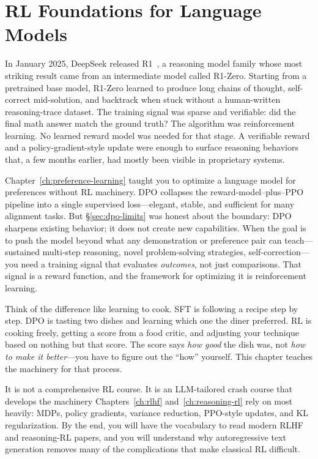 \chapter{RL Foundations for Language Models}
\label{ch:rl-foundations}
\raggedbottom

In January 2025, DeepSeek released R1~\cite{deepseekai2025r1}, a reasoning model family whose most striking result came from an intermediate model called R1-Zero. Starting from a pretrained base model, R1-Zero learned to produce long chains of thought, self-correct mid-solution, and backtrack when stuck without a human-written reasoning-trace dataset. The training signal was sparse and verifiable: did the final math answer match the ground truth? The algorithm was reinforcement learning. No learned reward model was needed for that stage. A verifiable reward and a policy-gradient-style update were enough to surface reasoning behaviors that, a few months earlier, had mostly been visible in proprietary systems.

Chapter~\ref{ch:preference-learning} taught you to optimize a language model for preferences without RL machinery. DPO collapses the reward-model--plus--PPO pipeline into a single supervised loss---elegant, stable, and sufficient for many alignment tasks. But \S\ref{sec:dpo-limits} was honest about the boundary: DPO sharpens existing behavior; it does not create new capabilities. When the goal is to push the model beyond what any demonstration or preference pair can teach---sustained multi-step reasoning, novel problem-solving strategies, self-correction---you need a training signal that evaluates \emph{outcomes}, not just comparisons. That signal is a reward function, and the framework for optimizing it is reinforcement learning.

Think of the difference like learning to cook. SFT is following a recipe step by step. DPO is tasting two dishes and learning which one the diner preferred. RL is cooking freely, getting a score from a food critic, and adjusting your technique based on nothing but that score. The score says \emph{how good} the dish was, not \emph{how to make it better}---you have to figure out the ``how'' yourself. This chapter teaches the machinery for that process.

It is not a comprehensive RL course. It is an LLM-tailored crash course that develops the machinery Chapters~\ref{ch:rlhf} and~\ref{ch:reasoning-rl} rely on most heavily: MDPs, policy gradients, variance reduction, PPO-style updates, and KL regularization. By the end, you will have the vocabulary to read modern RLHF and reasoning-RL papers, and you will understand why autoregressive text generation removes many of the complications that make classical RL difficult.

